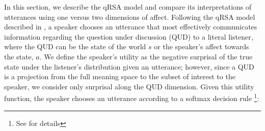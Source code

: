 \documentclass[10pt,letterpaper]{article}
\begin{document}
In this section, we describe the qRSA model and compare its interpretations of utterances using one versus two dimensions of affect. 
%
%
%
Following the qRSA model described in \cite{kao2014nonliteral}, a speaker chooses an utterance that most effectively communicates information regarding the question under discussion (QUD) to a literal listener, where the QUD can be the state of the world $s$ or the speaker's affect towards the state, $a$.
We define the speaker's utility as the negative surprisal of the true state under the listener's distribution given an utterance; however, since a QUD is a projection from the full meaning space to the subset of interest to the speaker, we consider only surprisal along the QUD dimension.   
Given this utility function, the speaker chooses an utterance according to a softmax decision rule \cite{sutton1998reinforcement}\footnote{See \cite{kao2014nonliteral} for details}:
\end{document}
